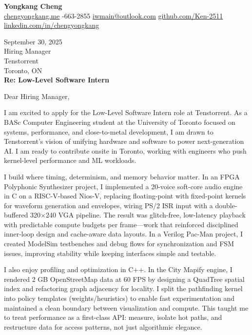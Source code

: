 \documentclass[letterpaper,10pt]{article}
\begin{document}
\begin{center}
    {\huge \textbf{Yongkang Cheng}}\\[2pt]
    {\small
    \href{https://chengyongkang.me/}{\uline{chengyongkang.me}} \;\textbar{}-663-2855 \;\textbar\; 
    \href{mailto:iwmain@outlook.com}{\uline{iwmain@outlook.com}} \;\textbar\; 
    \href{https://www.github.com/Ken-2511/}{\uline{github.com/Ken-2511}} \;\textbar\; 
    \href{https://www.linkedin.com/in/chengyongkang/}{\uline{linkedin.com/in/chengyongkang}}}
\end{center}

\vspace{0.5em}
September 30, 2025\\
Hiring Manager\\
Tenstorrent\\
Toronto, ON\\

\vspace{0.8em}
\textbf{Re: Low-Level Software Intern}

\vspace{0.6em}
Dear Hiring Manager,

I am excited to apply for the Low-Level Software Intern role at Tenstorrent. As a BASc Computer Engineering student at the University of Toronto focused on systems, performance, and close-to-metal development, I am drawn to Tenstorrent’s vision of unifying hardware and software to power next-generation AI. I am ready to contribute onsite in Toronto, working with engineers who push kernel-level performance and ML workloads.

I build where timing, determinism, and memory behavior matter. In an FPGA Polyphonic Synthesizer project, I implemented a 20-voice soft-core audio engine in C on a RISC-V-based Nios-V, replacing floating-point with fixed-point kernels for waveform generation and envelopes, wiring PS/2 ISR input with a double-buffered 320×240 VGA pipeline. The result was glitch-free, low-latency playback with predictable compute budgets per frame—work that reinforced disciplined inner-loop design and cache-aware data layouts. In a Verilog Pac-Man project, I created ModelSim testbenches and debug flows for synchronization and FSM issues, improving stability while keeping interfaces simple and testable.

I also enjoy profiling and optimization in C++. In the City Mapify engine, I rendered 2 GB OpenStreetMap data at 60 FPS by designing a QuadTree spatial index and refactoring graph adjacency for locality. I split the pathfinding kernel into policy templates (weights/heuristics) to enable fast experimentation and maintained a clean boundary between visualization and compute. This taught me to treat performance as a first-class API: measure, isolate hot paths, and restructure data for access patterns, not just algorithmic elegance.
\end{document}
